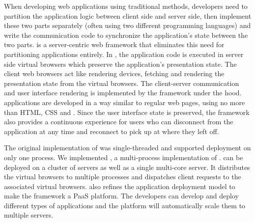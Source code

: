 \documentclass[12pt]{report}
\begin{document}
When developing web applications using traditional methods, developers
need to partition the application logic between client side and server side,
then implement these two parts separately (often using two different
programming languages) and write the communication code to synchronize
the application's state between the two parts. \cb is a server-centric web
framework that eliminates this need for partitioning applications entirely. In
\cb, the application code is executed in server side virtual browsers
which preserve the application's presentation state. The client web
browsers act like rendering devices, fetching and rendering the presentation
state from the virtual browsers. The client-server communication and user
interface rendering is implemented by the framework under the hood. 
\cb applications are developed in a way similar to regular web pages, using no
more than HTML, CSS and \js. Since the user interface state is
preserved, the framework also provides a continuous experience for
users who can disconnect from the application at any time and reconnect to
pick up at where they left off.

The original implementation of \cb was single-threaded  and supported
deployment on only one process. We implemented \cbtwo, a multi-process
implementation of \cb. \cbtwo can be deployed on a cluster of servers as well
as a single multi-core server. It distributes the virtual browsers to multiple
processes and  dispatches client requests to the associated virtual browsers.
\cbtwo also refines the \cb application deployment model to make the framework
a PaaS platform. The developers can develop and deploy different types of
applications and the platform will automatically scale them to multiple
servers.



\end{document}
